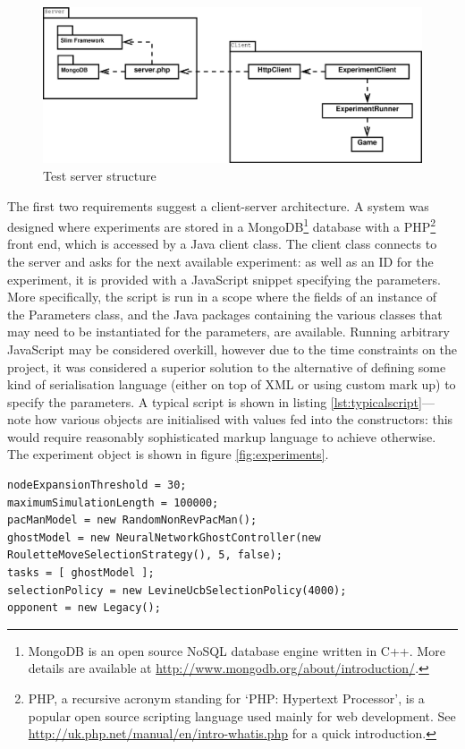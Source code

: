 \begin{figure}
\includegraphics[width=\linewidth]{diagrams/testserver}
\caption{Test server structure}
\label{fig:testserver}
\end{figure}


The first two requirements suggest a client-server architecture.  A system was designed where experiments are stored in a MongoDB\footnote{MongoDB is an open source NoSQL database engine written in C++.  More details are available at \url{http://www.mongodb.org/about/introduction/}.} database with a PHP\footnote{PHP, a recursive acronym standing for `PHP: Hypertext Processor', is a popular open source scripting language used mainly for web development.  See \url{http://uk.php.net/manual/en/intro-whatis.php} for a quick introduction.} front end, which is accessed by a Java client class.  The client class connects to the server and asks for the next available experiment: as well as an ID for the experiment, it is provided with a JavaScript snippet specifying the parameters.  More specifically, the script is run in a scope where the fields of an instance of the Parameters class, and the Java packages containing the various classes that may need to be instantiated for the parameters, are available.  Running arbitrary JavaScript may be considered overkill, however due to the time constraints on the project, it was considered a superior solution to the alternative of defining some kind of serialisation language (either on top of XML or using custom mark up) to specify the parameters.  A typical script is shown in listing \ref{lst:typicalscript}---note how various objects are initialised with values fed into the constructors: this would require reasonably sophisticated markup language to achieve otherwise.  The experiment object is shown in figure \ref{fig:experiments}.

\begin{lstlisting}[breaklines=true,caption={A typical parameters script},captionpos=b,label=lst:typicalscript,float]
nodeExpansionThreshold = 30;
maximumSimulationLength = 100000;
pacManModel = new RandomNonRevPacMan();
ghostModel = new NeuralNetworkGhostController(new RouletteMoveSelectionStrategy(), 5, false);
tasks = [ ghostModel ];
selectionPolicy = new LevineUcbSelectionPolicy(4000);
opponent = new Legacy();
\end{lstlisting}

